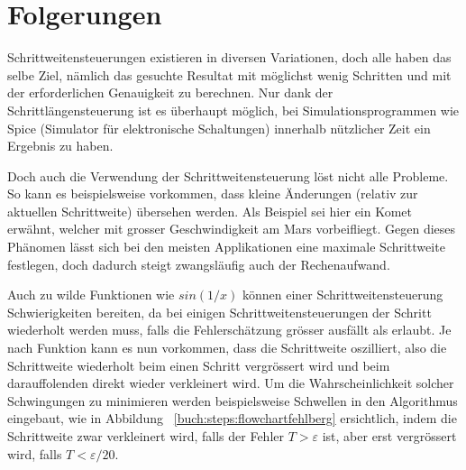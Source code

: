 %
%
%
\section{Folgerungen
\label{steps:section:folgerungen}}
Schrittweitensteuerungen existieren in diversen Variationen, doch alle haben das selbe Ziel, nämlich
das gesuchte Resultat mit möglichst wenig Schritten und mit der erforderlichen Genauigkeit zu berechnen.
Nur dank der Schrittlängensteuerung ist es überhaupt möglich, bei Simulationsprogrammen wie Spice (Simulator für elektronische Schaltungen)
innerhalb nützlicher Zeit ein Ergebnis zu haben.

Doch auch die Verwendung der Schrittweitensteuerung löst nicht alle Probleme.
So kann es beispielsweise vorkommen, dass kleine Änderungen (relativ zur aktuellen Schrittweite) übersehen werden.
Als Beispiel sei hier ein Komet erwähnt, welcher mit grosser Geschwindigkeit am Mars vorbeifliegt.
Gegen dieses Phänomen lässt sich bei den meisten Applikationen eine maximale Schrittweite festlegen,
doch dadurch steigt zwangsläufig auch der Rechenaufwand.

Auch zu wilde Funktionen wie $sin(1/x)$ können einer Schrittweitensteuerung Schwierigkeiten bereiten,
da bei einigen Schrittweitensteuerungen der Schritt wiederholt werden muss,
falls die Fehlerschätzung grösser ausfällt als erlaubt. Je nach Funktion kann es nun vorkommen,
dass die Schrittweite oszilliert, also die Schrittweite wiederholt beim einen Schritt vergrössert wird und beim darauffolenden direkt wieder verkleinert wird.
Um die Wahrscheinlichkeit solcher Schwingungen zu minimieren werden beispielsweise Schwellen in den Algorithmus eingebaut,
wie in Abbildung ~\ref{buch:steps:flowchartfehlberg} ersichtlich, indem die Schrittweite zwar verkleinert wird,
falls der Fehler $T > \varepsilon$ ist, aber erst vergrössert wird, falls $T < \varepsilon / 20$.

